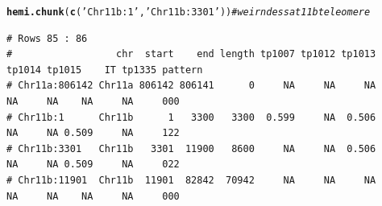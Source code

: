 \documentclass{article}\usepackage[]{graphicx}\usepackage[]{color}
\makeatletter
\newcommand{\hlstr}[1]{\textcolor[rgb]{0.192,0.494,0.8}{#1}}%
\newcommand{\hlcom}[1]{\textcolor[rgb]{0.678,0.584,0.686}{\textit{#1}}}%
\newcommand{\hlstd}[1]{\textcolor[rgb]{0.345,0.345,0.345}{#1}}%
\newcommand{\hlkwd}[1]{\textcolor[rgb]{0.737,0.353,0.396}{\textbf{#1}}}%
\newenvironment{kframe}{%
 \def\at@end@of@kframe{}%
 \ifinner\ifhmode%
  \def\at@end@of@kframe{\end{minipage}}%
  \begin{minipage}{\columnwidth}%
 \fi\fi%
 \def\FrameCommand##1{\hskip\@totalleftmargin \hskip-\fboxsep
 \colorbox{shadecolor}{##1}\hskip-\fboxsep
     \hskip-\linewidth \hskip-\@totalleftmargin \hskip\columnwidth}%
 \MakeFramed {\advance\hsize-\width
   \@totalleftmargin\z@ \linewidth\hsize
   \@setminipage}}%
 {\par\unskip\endMakeFramed%
 \at@end@of@kframe}
\newenvironment{knitrout}{}{} %
\makeatother
\begin{document}
\begin{knitrout}\footnotesize
{}\color{fgcolor}\begin{kframe}
\begin{alltt}
\hlkwd{hemi.chunk}\hlstd{(}\hlkwd{c}\hlstd{(}\hlstr{'Chr11b:1'}\hlstd{,}\hlstr{'Chr11b:3301'}\hlstd{))} \hlcom{# weirndess at 11b teleomere}
\end{alltt}
\begin{verbatim}
# Rows 85 : 86 
#                  chr  start    end length tp1007 tp1012 tp1013 tp1014 tp1015    IT tp1335 pattern
# Chr11a:806142 Chr11a 806142 806141      0     NA     NA     NA     NA     NA    NA     NA     000
# Chr11b:1      Chr11b      1   3300   3300  0.599     NA  0.506     NA     NA 0.509     NA     122
# Chr11b:3301   Chr11b   3301  11900   8600     NA     NA  0.506     NA     NA 0.509     NA     022
# Chr11b:11901  Chr11b  11901  82842  70942     NA     NA     NA     NA     NA    NA     NA     000
\end{verbatim}
\end{kframe}


\end{knitrout}
\end{document}
